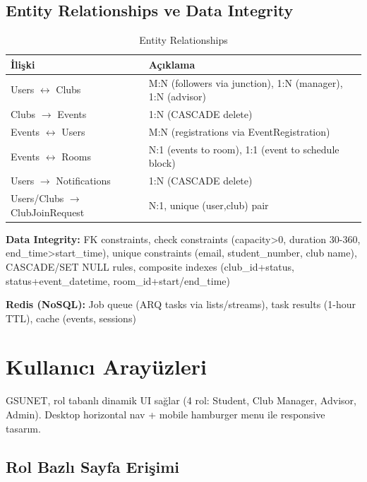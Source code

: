 \documentclass[a4paper,12pt]{report}
\begin{document}
\subsection{Entity Relationships ve Data Integrity}

\begin{table}[h]
\centering
\small
\begin{tabular}{|l|p{10cm}|}
\hline
\textbf{İlişki} & \textbf{Açıklama} \\ \hline
Users $\leftrightarrow$ Clubs & M:N (followers via junction), 1:N (manager), 1:N (advisor) \\ \hline
Clubs $\rightarrow$ Events & 1:N (CASCADE delete) \\ \hline
Events $\leftrightarrow$ Users & M:N (registrations via EventRegistration) \\ \hline
Events $\leftrightarrow$ Rooms & N:1 (events to room), 1:1 (event to schedule block) \\ \hline
Users $\rightarrow$ Notifications & 1:N (CASCADE delete) \\ \hline
Users/Clubs $\rightarrow$ ClubJoinRequest & N:1, unique (user,club) pair \\ \hline
\end{tabular}
\caption{Entity Relationships}
\end{table}

\vspace{0.2cm}

\noindent\textbf{Data Integrity:} FK constraints, check constraints (capacity>0, duration 30-360, end\_time>start\_time), unique constraints (email, student\_number, club name), CASCADE/SET NULL rules, composite indexes (club\_id+status, status+event\_datetime, room\_id+start/end\_time)

\noindent\textbf{Redis (NoSQL):} Job queue (ARQ tasks via lists/streams), task results (1-hour TTL), cache (events, sessions)

\section{Kullanıcı Arayüzleri}

GSUNET, rol tabanlı dinamik UI sağlar (4 rol: Student, Club Manager, Advisor, Admin). Desktop horizontal nav + mobile hamburger menu ile responsive tasarım.

\subsection{Rol Bazlı Sayfa Erişimi}
\end{document}
